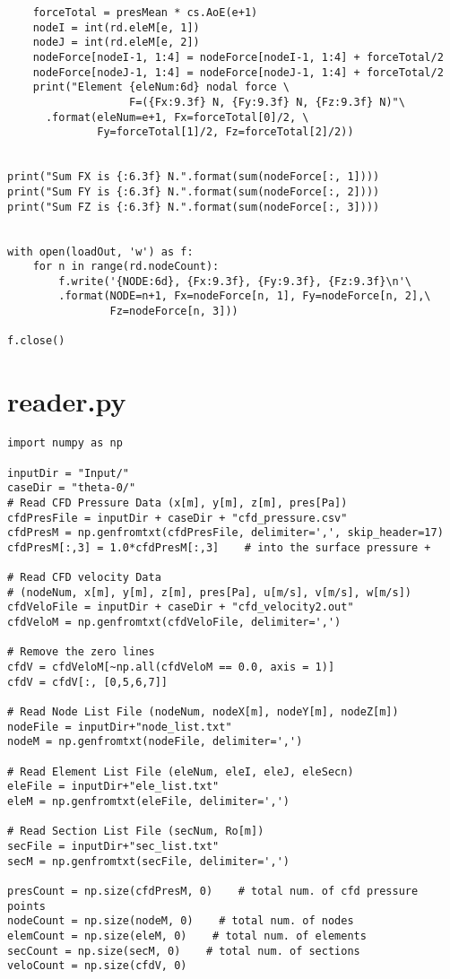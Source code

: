 \begin{verbatim}
    forceTotal = presMean * cs.AoE(e+1)
    nodeI = int(rd.eleM[e, 1])
    nodeJ = int(rd.eleM[e, 2])
    nodeForce[nodeI-1, 1:4] = nodeForce[nodeI-1, 1:4] + forceTotal/2
    nodeForce[nodeJ-1, 1:4] = nodeForce[nodeJ-1, 1:4] + forceTotal/2
    print("Element {eleNum:6d} nodal force \
                   F=({Fx:9.3f} N, {Fy:9.3f} N, {Fz:9.3f} N)"\
      .format(eleNum=e+1, Fx=forceTotal[0]/2, \
              Fy=forceTotal[1]/2, Fz=forceTotal[2]/2))


print("Sum FX is {:6.3f} N.".format(sum(nodeForce[:, 1])))
print("Sum FY is {:6.3f} N.".format(sum(nodeForce[:, 2])))
print("Sum FZ is {:6.3f} N.".format(sum(nodeForce[:, 3])))


with open(loadOut, 'w') as f:
    for n in range(rd.nodeCount):
        f.write('{NODE:6d}, {Fx:9.3f}, {Fy:9.3f}, {Fz:9.3f}\n'\
        .format(NODE=n+1, Fx=nodeForce[n, 1], Fy=nodeForce[n, 2],\
                Fz=nodeForce[n, 3]))

f.close()

\end{verbatim}

\section{reader.py}
\begin{verbatim}
import numpy as np

inputDir = "Input/"
caseDir = "theta-0/"
# Read CFD Pressure Data (x[m], y[m], z[m], pres[Pa])
cfdPresFile = inputDir + caseDir + "cfd_pressure.csv"
cfdPresM = np.genfromtxt(cfdPresFile, delimiter=',', skip_header=17)
cfdPresM[:,3] = 1.0*cfdPresM[:,3]    # into the surface pressure +

# Read CFD velocity Data
# (nodeNum, x[m], y[m], z[m], pres[Pa], u[m/s], v[m/s], w[m/s])
cfdVeloFile = inputDir + caseDir + "cfd_velocity2.out"
cfdVeloM = np.genfromtxt(cfdVeloFile, delimiter=',')

# Remove the zero lines
cfdV = cfdVeloM[~np.all(cfdVeloM == 0.0, axis = 1)]
cfdV = cfdV[:, [0,5,6,7]]

# Read Node List File (nodeNum, nodeX[m], nodeY[m], nodeZ[m])
nodeFile = inputDir+"node_list.txt"
nodeM = np.genfromtxt(nodeFile, delimiter=',')

# Read Element List File (eleNum, eleI, eleJ, eleSecn)
eleFile = inputDir+"ele_list.txt"
eleM = np.genfromtxt(eleFile, delimiter=',')

# Read Section List File (secNum, Ro[m])
secFile = inputDir+"sec_list.txt"
secM = np.genfromtxt(secFile, delimiter=',')

presCount = np.size(cfdPresM, 0)    # total num. of cfd pressure points
nodeCount = np.size(nodeM, 0)    # total num. of nodes
elemCount = np.size(eleM, 0)    # total num. of elements
secCount = np.size(secM, 0)    # total num. of sections
veloCount = np.size(cfdV, 0)

\end{verbatim}

